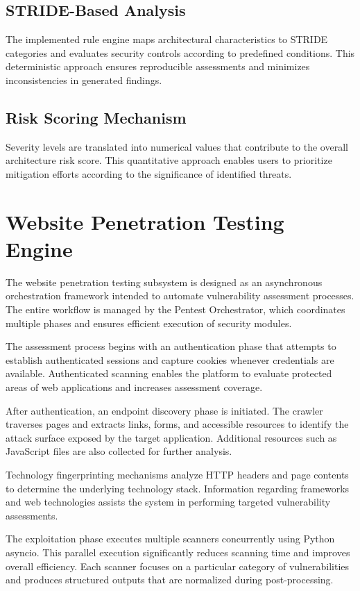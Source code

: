 \subsection{STRIDE-Based Analysis}
The implemented rule engine maps architectural characteristics to STRIDE categories and evaluates security controls according to predefined conditions. This deterministic approach ensures reproducible assessments and minimizes inconsistencies in generated findings.

\subsection{Risk Scoring Mechanism}
Severity levels are translated into numerical values that contribute to the overall architecture risk score. This quantitative approach enables users to prioritize mitigation efforts according to the significance of identified threats.

\section{Website Penetration Testing Engine}
The website penetration testing subsystem is designed as an asynchronous orchestration framework intended to automate vulnerability assessment processes. The entire workflow is managed by the Pentest Orchestrator, which coordinates multiple phases and ensures efficient execution of security modules.

The assessment process begins with an authentication phase that attempts to establish authenticated sessions and capture cookies whenever credentials are available. Authenticated scanning enables the platform to evaluate protected areas of web applications and increases assessment coverage.

After authentication, an endpoint discovery phase is initiated. The crawler traverses pages and extracts links, forms, and accessible resources to identify the attack surface exposed by the target application. Additional resources such as JavaScript files are also collected for further analysis.

Technology fingerprinting mechanisms analyze HTTP headers and page contents to determine the underlying technology stack. Information regarding frameworks and web technologies assists the system in performing targeted vulnerability assessments.

The exploitation phase executes multiple scanners concurrently using Python asyncio. This parallel execution significantly reduces scanning time and improves overall efficiency. Each scanner focuses on a particular category of vulnerabilities and produces structured outputs that are normalized during post-processing.

